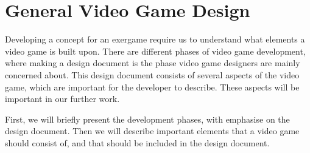 \chapter{General Video Game Design} 
\label{chap:vg}
Developing a concept for an exergame require us to understand what elements a video game is built upon. There are different phases of video game development, where making a design document is the phase video game designers are mainly concerned about. This design document consists of several aspects of the video game, which are important for the developer to describe. These aspects will be important in our further work.

First, we will briefly present the development phases, with emphasise on the design document. Then we will describe important elements that a video game should consist of, and that should be included in the design document.  

